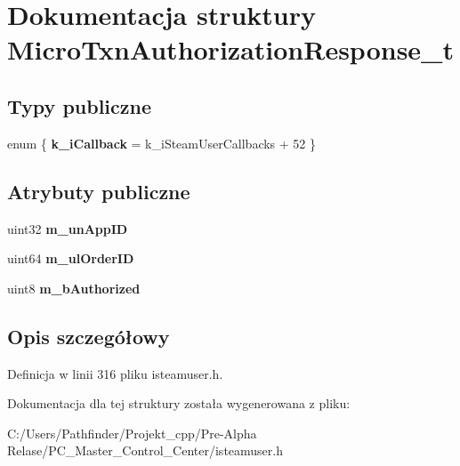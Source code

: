 \hypertarget{struct_micro_txn_authorization_response__t}{}\section{Dokumentacja struktury Micro\+Txn\+Authorization\+Response\+\_\+t}
\label{struct_micro_txn_authorization_response__t}
\subsection*{Typy publiczne}
\begin{DoxyCompactItemize}
\item 
\mbox{\label{struct_micro_txn_authorization_response__t_a1809278ad48eeec03050a97054a1ca09}} 
enum \{ {\bfseries k\+\_\+i\+Callback} = k\+\_\+i\+Steam\+User\+Callbacks + 52
 \}
\end{DoxyCompactItemize}
\subsection*{Atrybuty publiczne}
\begin{DoxyCompactItemize}
\item 
\mbox{\label{struct_micro_txn_authorization_response__t_a6ef2b8c6deb7831cdfcd6d9277d06c62}} 
uint32 {\bfseries m\+\_\+un\+App\+ID}
\item 
\mbox{\label{struct_micro_txn_authorization_response__t_a38de75bcdc25ddc7123c23dd764de240}} 
uint64 {\bfseries m\+\_\+ul\+Order\+ID}
\item 
\mbox{\label{struct_micro_txn_authorization_response__t_acceaade7e06f5a706d5112fb18d7fcfb}} 
uint8 {\bfseries m\+\_\+b\+Authorized}
\end{DoxyCompactItemize}


\subsection{Opis szczegółowy}


Definicja w linii 316 pliku isteamuser.\+h.



Dokumentacja dla tej struktury została wygenerowana z pliku\+:\begin{DoxyCompactItemize}
\item 
C\+:/\+Users/\+Pathfinder/\+Projekt\+\_\+cpp/\+Pre-\/\+Alpha Relase/\+P\+C\+\_\+\+Master\+\_\+\+Control\+\_\+\+Center/isteamuser.\+h\end{DoxyCompactItemize}
